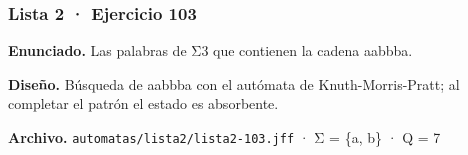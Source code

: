 
\hypertarget{lista-2-ejercicio-103}{%
\subsubsection{Lista 2 · Ejercicio 103}\label{lista-2-ejercicio-103}}

\textbf{Enunciado.} Las palabras de Σ3 que contienen la cadena aabbba.

\textbf{Diseño.} Búsqueda de aabbba con el autómata de Knuth-Morris-Pratt; al completar el patrón el estado es absorbente.

\textbf{Archivo.} \texttt{automatas/lista2/lista2-103.jff} · Σ = \{a, b\} · \textbar Q\textbar{} = 7


